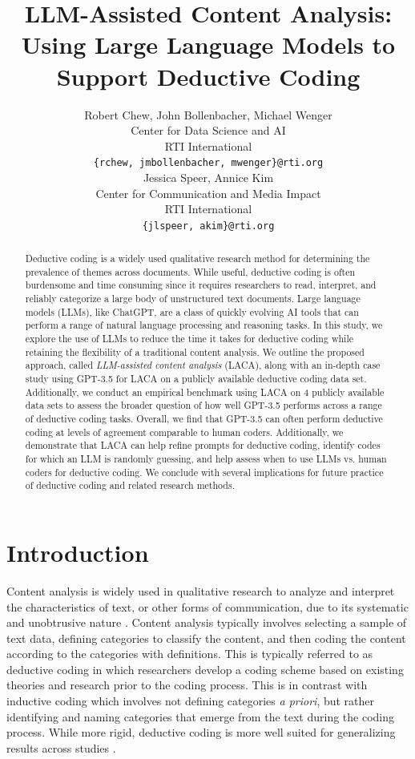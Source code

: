 \documentclass{article}
\title{LLM-Assisted Content Analysis: Using Large Language Models to Support Deductive Coding
}
\author{
  Robert Chew, John Bollenbacher, Michael Wenger \\
  Center for Data Science and AI \\
  RTI International \\
  \texttt{\{rchew, jmbollenbacher, mwenger\}@rti.org} \\
   \And
  Jessica Speer, Annice Kim \\
  Center for Communication and Media Impact \\
  RTI International \\
  \texttt{\{jlspeer, akim\}@rti.org} \\
}
\begin{document}
\maketitle

\begin{abstract}
Deductive coding is a widely used qualitative research method for determining the prevalence of themes across documents.  While useful, deductive coding is often burdensome and time consuming since it requires researchers to read, interpret, and reliably categorize a large body of unstructured text documents.  Large language models (LLMs), like ChatGPT, are a class of quickly evolving AI tools that can perform a range of natural language processing and reasoning tasks.   In this study, we explore the use of LLMs to reduce the time it takes for deductive coding while retaining the flexibility of a traditional content analysis.  We outline the proposed approach, called \emph{LLM-assisted content analysis} (LACA), along with an in-depth case study using GPT-3.5 for LACA on a publicly available deductive coding data set. Additionally, we conduct an empirical benchmark using LACA on 4 publicly available data sets to assess the broader question of how well GPT-3.5 performs across a range of deductive coding tasks. Overall, we find that GPT-3.5 can often perform deductive coding at levels of agreement comparable to human coders. Additionally, we demonstrate that LACA can help refine prompts for deductive coding, identify codes for which an LLM is randomly guessing, and help assess when to use LLMs vs. human coders for deductive coding. We conclude with several implications for future practice of deductive coding and related research methods.
\end{abstract}


\section{Introduction}
Content analysis is widely used in qualitative research to analyze and interpret the characteristics of text, or other forms of communication, due to its systematic and unobtrusive nature \cite{united_states_government_accountability_office_program_evaluation_and_methodology_division_content_1996}.  Content analysis typically involves selecting a sample of text data, defining categories to classify the content, and then coding the content according to the  categories with definitions. This is typically referred to as deductive coding in which researchers develop a coding scheme based on existing theories and research prior to the coding process.  This is in contrast with inductive coding which involves not defining categories \emph{a priori}, but rather identifying and naming  categories that emerge from the text during the coding process. While more rigid, deductive coding is  more well suited for generalizing results across studies \cite{linneberg2019coding}.
\end{document}
